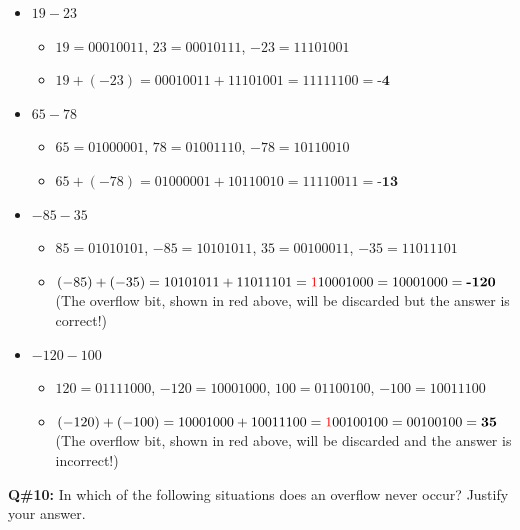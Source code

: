 \begin{itemize}
  \item[a)] $19 - 23$
  \begin{itemize}
    \item $19 = 00010011$, $23 = 00010111$, $-23 = 11101001$
    \item $19 + (-23) = 00010011 + 11101001 = 11111100 = \textbf{-4}$
  \end{itemize}

  \item[b)] $65 - 78$
  \begin{itemize}
    \item $65 = 01000001$, $78 = 01001110$, $-78 = 10110010$
    \item $65 + (-78) = 01000001 + 10110010 = 11110011 = \textbf{-13}$
  \end{itemize}

  \item[c)] $-85 - 35$
  \begin{itemize}
    \item $85 = 01010101$, $-85 = 10101011$, $35 = 00100011$, $-35 = 11011101$
    \item $(-85) + (-35) = 10101011 + 11011101 = \textcolor{red}{1}10001000 = 10001000 = \textbf{-120}$\\
    (The overflow bit, shown in red above, will be discarded but the answer is correct!)
  \end{itemize}

  \item[d)] $-120 - 100$
  \begin{itemize}
    \item $120 = 01111000$, $-120 = 10001000$, $100 = 01100100$, $-100 = 10011100$
    \item $(-120) + (-100) = 10001000 + 10011100 = \textcolor{red}{1}00100100 = 00100100 = \textbf{35}$\\
    (The overflow bit, shown in red above, will be discarded and the answer is incorrect!)
  \end{itemize}
\end{itemize}

\vspace{1em}
\textbf{Q\#10:} In which of the following situations does an overflow never occur? Justify your answer.

